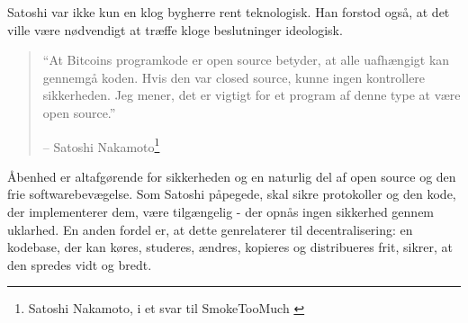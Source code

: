 \documentclass[paper=6in:9in,pagesize=pdftex,
               headinclude=on,footinclude=on,12pt]{scrbook}
\begin{document}
Satoshi var ikke kun en klog bygherre rent teknologisk. Han forstod også, at det ville være nødvendigt at træffe kloge beslutninger ideologisk.\begin{quotation}\begin{samepage} \enquote{At Bitcoins programkode er open source betyder, at alle uafhængigt kan gennemgå koden. Hvis den var closed source, kunne ingen kontrollere sikkerheden. Jeg mener, det er vigtigt for et program af denne type at være open source.} \begin{flushright} -- Satoshi Nakamoto\footnote{Satoshi Nakamoto, i et svar til SmokeTooMuch \cite{satoshi-open-source}}
\end{flushright}\end{samepage}\end{quotation}

Åbenhed er altafgørende for sikkerheden og en naturlig del af open source og den frie softwarebevægelse. Som Satoshi påpegede, skal sikre protokoller og den kode, der implementerer dem, være tilgængelig - der opnås ingen sikkerhed gennem uklarhed. En anden fordel er, at dette genrelaterer til decentralisering: en kodebase, der kan køres, studeres, ændres, kopieres og distribueres frit, sikrer, at den spredes vidt og bredt.
\end{document}
